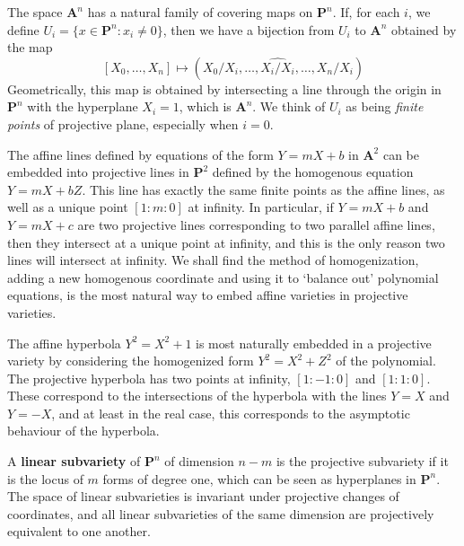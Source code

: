 The space $\mathbf{A}^n$ has a natural family of covering maps on $\mathbf{P}^n$. If, for each $i$, we define $U_i = \{ x \in \mathbf{P}^n: x_i \neq 0 \}$, then we have a bijection from $U_i$ to $\mathbf{A}^n$ obtained by the map
%
\[ [X_0, \dots, X_n] \mapsto (X_0/X_i, \dots, \widehat{X_i/X_i} ,\dots, X_n/X_i) \]
%
Geometrically, this map is obtained by intersecting a line through the origin in $\mathbf{P}^n$ with the hyperplane $X_i = 1$, which is $\mathbf{A}^n$. We think of $U_i$ as being {\it finite points} of projective plane, especially when $i = 0$.

\begin{example}
    The affine lines defined by equations of the form $Y = mX + b$ in $\mathbf{A}^2$ can be embedded into projective lines in $\mathbf{P}^2$ defined by the homogenous equation $Y = mX + bZ$. This line has exactly the same finite points as the affine lines, as well as a unique point $[1:m:0]$ at infinity. In particular, if $Y = mX + b$ and $Y = mX + c$ are two projective lines corresponding to two parallel affine lines, then they intersect at a unique point at infinity, and this is the only reason two lines will intersect at infinity. We shall find the method of homogenization, adding a new homogenous coordinate and using it to `balance out' polynomial equations, is the most natural way to embed affine varieties in projective varieties.
\end{example}

\begin{example}
    The affine hyperbola $Y^2 = X^2 + 1$ is most naturally embedded in a projective variety by considering the homogenized form $Y^2 = X^2 + Z^2$ of the polynomial. The projective hyperbola has two points at infinity, $[1:-1:0]$ and $[1:1:0]$. These correspond to the intersections of the hyperbola with the lines $Y = X$ and $Y = -X$, and at least in the real case, this corresponds to the asymptotic behaviour of the hyperbola.
\end{example}

\begin{example}
    A {\bf linear subvariety} of $\mathbf{P}^n$ of dimension $n-m$ is the projective subvariety if it is the locus of $m$ forms of degree one, which can be seen as hyperplanes in $\mathbf{P}^n$. The space of linear subvarieties is invariant under projective changes of coordinates, and all linear subvarieties of the same dimension are projectively equivalent to one another.
\end{example}

